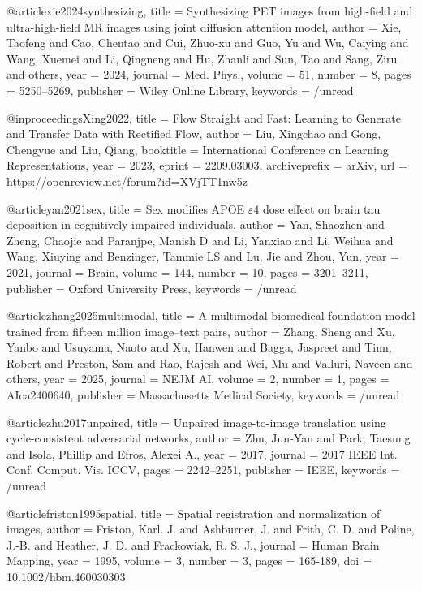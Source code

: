 @article{xie2024synthesizing,
  title = {Synthesizing {{PET}} images from high-field and ultra-high-field {{MR}} images using joint diffusion attention model},
  author = {Xie, Taofeng and Cao, Chentao and Cui, Zhuo-xu and Guo, Yu and Wu, Caiying and Wang, Xuemei and Li, Qingneng and Hu, Zhanli and Sun, Tao and Sang, Ziru and others},
  year = 2024,
  journal = {Med. Phys.},
  volume = {51},
  number = {8},
  pages = {5250--5269},
  publisher = {Wiley Online Library},
  keywords = {/unread}
}

@inproceedings{Xing2022,
 title = {Flow Straight and Fast: Learning to Generate and Transfer Data with Rectified Flow},
 author = {Liu, Xingchao and Gong, Chengyue and Liu, Qiang},
 booktitle = {International Conference on Learning Representations},
 year = {2023},
 eprint = {2209.03003},
 archiveprefix = {arXiv},
 url = {https://openreview.net/forum?id=XVjTT1nw5z}
}

@article{yan2021sex,
  title = {Sex modifies {{APOE}} {{$\varepsilon$}}4 dose effect on brain tau deposition in cognitively impaired individuals},
  author = {Yan, Shaozhen and Zheng, Chaojie and Paranjpe, Manish D and Li, Yanxiao and Li, Weihua and Wang, Xiuying and Benzinger, Tammie LS and Lu, Jie and Zhou, Yun},
  year = 2021,
  journal = {Brain},
  volume = {144},
  number = {10},
  pages = {3201--3211},
  publisher = {Oxford University Press},
  keywords = {/unread}
}

@article{zhang2025multimodal,
  title = {A multimodal biomedical foundation model trained from fifteen million image--text pairs},
  author = {Zhang, Sheng and Xu, Yanbo and Usuyama, Naoto and Xu, Hanwen and Bagga, Jaspreet and Tinn, Robert and Preston, Sam and Rao, Rajesh and Wei, Mu and Valluri, Naveen and others},
  year = 2025,
  journal = {NEJM AI},
  volume = {2},
  number = {1},
  pages = {AIoa2400640},
  publisher = {Massachusetts Medical Society},
  keywords = {/unread}
}

@article{zhu2017unpaired,
  title = {Unpaired image-to-image translation using cycle-consistent adversarial networks},
  author = {Zhu, Jun-Yan and Park, Taesung and Isola, Phillip and Efros, Alexei A.},
  year = 2017,
  journal = {2017 IEEE Int. Conf. Comput. Vis. ICCV},
  pages = {2242--2251},
  publisher = {IEEE},
  keywords = {/unread}
}



@article{friston1995spatial,
  title = {Spatial registration and normalization of images},
  author = {Friston, Karl. J. and Ashburner, J. and Frith, C. D. and Poline, J.‐B. and Heather, J. D. and Frackowiak, R. S. J.},
  journal = {Human Brain Mapping},
  year = {1995},
  volume = {3},
  number = {3},
  pages = {165-189},
  doi = {10.1002/hbm.460030303}
}

